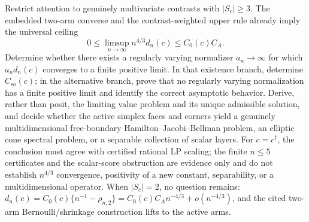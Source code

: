 Restrict attention to genuinely multivariate contrasts with \(|S_c|\geq3\).  The embedded two-arm converse and the contrast-weighted upper rule already imply the universal ceiling
\[
 0\leq\limsup_{n\to\infty}n^{4/3}d_n(c)\leq C_0(c)C_A.
\]
Determine whether there exists a regularly varying normalizer \(a_n\to\infty\) for which \(a_nd_n(c)\) converges to a finite positive limit.  In that existence branch, determine \(C_{\mathrm{so}}(c)\); in the alternative branch, prove that no regularly varying normalization has a finite positive limit and identify the correct asymptotic behavior.  Derive, rather than posit, the limiting value problem and its unique admissible solution, and decide whether the active simplex faces and corners yield a genuinely multidimensional free-boundary Hamilton--Jacobi--Bellman problem, an elliptic cone spectral problem, or a separable collection of scalar layers.  For \(c=c^\dagger\), the conclusion must agree with certified rational LP scaling; the finite \(n\leq5\) certificates and the scalar-score obstruction are evidence only and do not establish \(n^{4/3}\) convergence, positivity of a new constant, separability, or a multidimensional operator.  When \(|S_c|=2\), no question remains: \(d_n(c)=C_0(c)\{n^{-1}-\rho_{n,2}\}=C_0(c)C_A n^{-4/3}+o(n^{-4/3})\), and the cited two-arm Bernoulli/shrinkage construction lifts to the active arms.